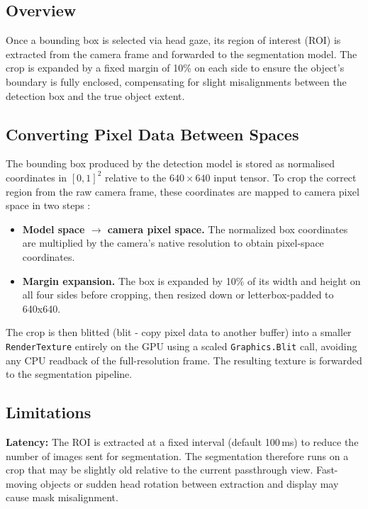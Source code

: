 \documentclass{article}
\begin{document}
\subsection{Overview}
Once a bounding box is selected via head gaze, its region of interest (ROI) is extracted
from the camera frame and forwarded to the segmentation model. The crop is expanded by a
fixed margin of 10\% on each side to ensure the object's boundary is fully enclosed,
compensating for slight misalignments between the detection box and the true object
extent.

\subsection{Converting Pixel Data Between Spaces}
The bounding box produced by the detection model is stored as normalised coordinates in
$[0, 1]^2$ relative to the $640 \times 640$ input tensor. To crop the correct region
from the raw camera frame, these coordinates are mapped to camera pixel space in two
steps :

\begin{itemize}
    \item \textbf{Model space $\to$ camera pixel space.} The normalized box coordinates
    are multiplied by the camera's native resolution to obtain pixel-space
    coordinates. 

    \item \textbf{Margin expansion.} The box is expanded by 10\% of its width and height
    on all four sides before cropping, then resized down or letterbox-padded to 640x640.
\end{itemize}

The crop is then blitted (blit - copy pixel data to another buffer) into a smaller \texttt{RenderTexture} entirely on the GPU using
a scaled \texttt{Graphics.Blit} call, avoiding any CPU readback of the full-resolution
frame. The resulting texture is forwarded to the segmentation pipeline.

\subsection{Limitations}
\begin{itemize}
    \textbf{Latency:} The ROI is extracted at a fixed interval (default 100\,ms) to reduce the number of images sent for segmentation. The segmentation therefore runs on a crop that may be slightly old relative to the current passthrough view. Fast-moving objects or sudden head rotation between extraction and display may cause mask misalignment.

\end{itemize}
\end{document}
